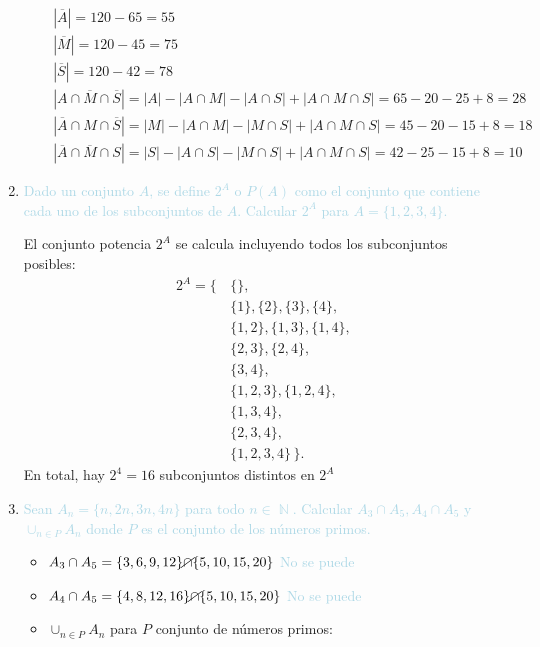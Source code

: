 \documentclass[12pt]{article}
\newcommand{\lb}[1]{\textcolor{lightblue}{#1}}
\DeclareMathOperator{\N}{\mathbb{N}}
\begin{document}
\begin{enumerate}[label=\color{red}\textbf{\arabic*)},leftmargin=*]
\begin{enumerate}[label=\color{red}\alph*)]
      	$\begin{array}{l}
      		\left|\overline{A}\right|=120-65=55\\
      		|\overline{M}|=120-45=75\\
      		|\overline{S}|=120-42=78\\
      		\left|A\cap \overline{M}\cap \overline{S}\right|=|A|-|A\cap M|-|A\cap S|+|A\cap M\cap S|=65-20-25+8=28\\
      		\left|\overline{A}\cap M\cap \overline{S}\right|=|M|-|A\cap M|-|M\cap S|+|A\cap M\cap S|=45-20-15+8=18\\
      		\left|\overline{A}\cap \overline{M}\cap S\right|=|S|-|A\cap S|-|M\cap S|+\left|A\cap M\cap S\right|=42-25-15+8=10
      	\end{array}$
      \end{enumerate}
      
      \item \lb{Dado un conjunto $A$, se define $2^A$ o $P(A)$ como el conjunto que contiene cada uno de los subconjuntos de $A$. Calcular $2^{A}$ para $A=\{1,2,3,4\}$.}
      
      El conjunto potencia $2^{A}$ se calcula incluyendo todos los subconjuntos posibles:
      \begin{align*}
      	2^A = \{\, &\{\}, \\
      	&\{1\}, \{2\}, \{3\}, \{4\}, \\
      	&\{1, 2\}, \{1, 3\}, \{1, 4\}, \\
      	&\{2, 3\}, \{2, 4\}, \\
      	&\{3, 4\}, \\
      	&\{1, 2, 3\}, \{1, 2, 4\}, \\
      	&\{1, 3, 4\}, \\
      	&\{2, 3, 4\}, \\
      	&\{1, 2, 3, 4\} \,\}.
      \end{align*}
      En total, hay $2^4=16$ subconjuntos distintos en $2^{A}$
      \item \lb{Sean $A_n=\{n,2n,3n,4n\}$ para todo $n\in\N$. Calcular $A_3\cap A_5,A_4\cap A_5$ y $\cup_{n\in P}A_n$ donde $P$ es el conjunto de los números primos.}
      \begin{itemize}[label=$-$]
      	\item $A_3\cap A_5=\{3,6,9,12\}\cancel{\cap}\{5,10,15,20\}$ \lb{No se puede}
      	\item $A_4\cap A_5=\{4,8,12,16\}\cancel{\cap}\{5,10,15,20\}$ \lb{No se puede}
      	\item $\cup_{n\in P}A_n$ para $P$ conjunto de números primos:
      	

\end{itemize}
\end{enumerate}
\end{document}
